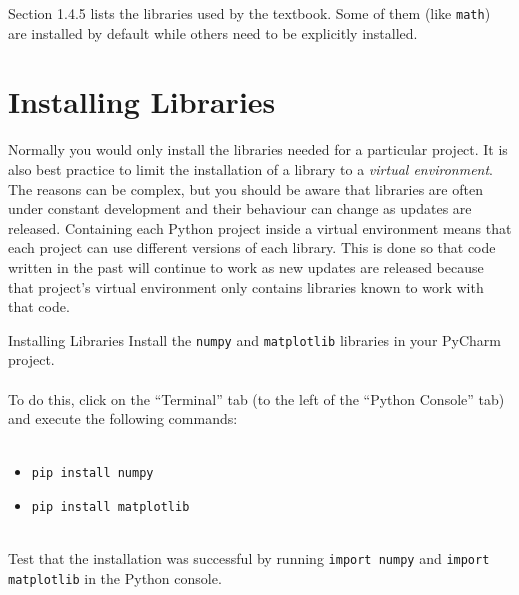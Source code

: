 \documentclass{lab}
\begin{document}
Section 1.4.5 lists the libraries used by the textbook. Some of them (like \texttt{math}) are installed by default while others need to be explicitly installed.

\pagebreak
\section{Installing Libraries}

Normally you would only install the libraries needed for a particular project. It is also best practice to limit the installation of a library to a \textit{virtual environment}. The reasons can be complex, but you should be aware that libraries are often under constant development and their behaviour can change as updates are released. Containing each Python project inside a virtual environment means that each project can use different versions of each library. This is done so that code written in the past will continue to work as new updates are released because that project's virtual environment only contains libraries known to work with that code.

\begin{task}{Installing Libraries}{}
Install the \texttt{numpy} and \texttt{matplotlib} libraries in your PyCharm project.
\\~\\
To do this, click on the ``Terminal'' tab (to the left of the ``Python Console'' tab) and execute the following commands:
\\~
\begin{itemize}
\item \texttt{pip install numpy}
\item \texttt{pip install matplotlib}
\end{itemize}
~\\
Test that the installation was successful by running \texttt{import numpy} and \texttt{import matplotlib} in the Python console.
\end{task}
\end{document}
